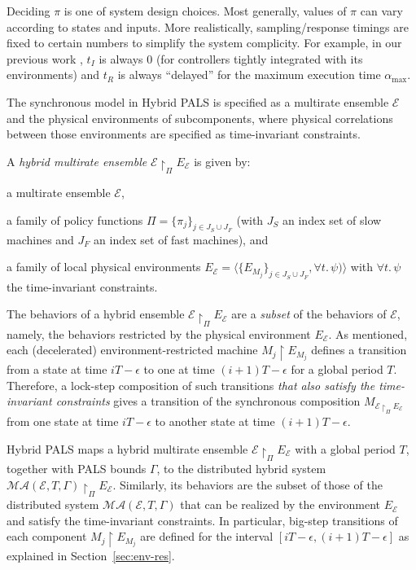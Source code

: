 Deciding $\pi$ is one of system design choices. 
Most generally, values of $\pi$ can vary
according to states and inputs.
More realistically, sampling/response timings are fixed 
to certain numbers to simplify the system complicity.
For example, in our previous work \cite{hybrid-pals}, $t_I$ is always $0$ 
(for controllers tightly integrated with its environments)
and $t_R$ is always ``delayed'' for 
the maximum execution time $\alpha_{\max}$.


The synchronous model in Hybrid PALS is specified
as a multirate ensemble $\mathcal{E}$ and  the physical environments of subcomponents,
where physical correlations between those environments
are specified as time-invariant constraints.

\begin{definition}
A \emph{hybrid multirate ensemble} $\mathcal{E}\restriction_{\Pi} E_{\mathcal{E}}$
is given by:
\begin{inparaenum}[(i)]
    \item a multirate ensemble $\mathcal{E}$, %
    \item a family of policy functions $\Pi=\{\pi_j\}_{j\in J_S  \cup J_F}$
    (with $J_S$ an index set of slow machines and $J_F$ an index set of fast machines),
    and
    \item a family of local physical environments 
    $E_\mathcal{E} = \langle\{E_{M_j}\}_{j\in J_S \cup J_F}, \forall t.\, \psi)\rangle$ 
    with $\forall t.\,\psi$ the time-invariant constraints.
\end{inparaenum}
\end{definition}   


The behaviors of a hybrid ensemble  $\mathcal{E} \restriction_{\Pi} E_\mathcal{E}$
are  a \emph{subset} of the behaviors of $\mathcal{E}$, namely, the behaviors restricted by 
the physical environment $E_\mathcal{E}$.
As mentioned,
each (decelerated) environment-restricted machine $M_j \restriction E_{M_j}$ defines 
a transition from a state  at time $iT - \epsilon$ to one at time $(i+1)T-\epsilon$ for a global period $T$.
Therefore, a lock-step composition of such %
transitions
\emph{that also satisfy the time-invariant constraints} gives a transition of 
the synchronous composition $M_{\mathcal{E} \restriction_{\Pi} E_\mathcal{E}}$
from one state at time $iT - \epsilon$ to another state at time $(i+1)T-\epsilon$.


Hybrid PALS maps a hybrid multirate ensemble
$\mathcal{E}\restriction_{\Pi} E_\mathcal{E}$ with a global period $T$, 
together with PALS bounds $\Gamma$,  to the distributed hybrid system  
$\mathcal{MA}(\mathcal{E}, T, \Gamma) \restriction_{\Pi} E_\mathcal{E}$.
Similarly, its  behaviors are the subset of those of the %
distributed system $\mathcal{MA}(\mathcal{E}, T, \Gamma)$ that can be realized
by the %
environment $E_\mathcal{E}$
and satisfy the time-invariant constraints.
In particular, big-step transitions of each component $M_j \restriction E_{M_j}$ are
defined for the interval $[iT - \epsilon, (i+1)T-\epsilon]$
 as explained in Section~\ref{sec:env-res}.


